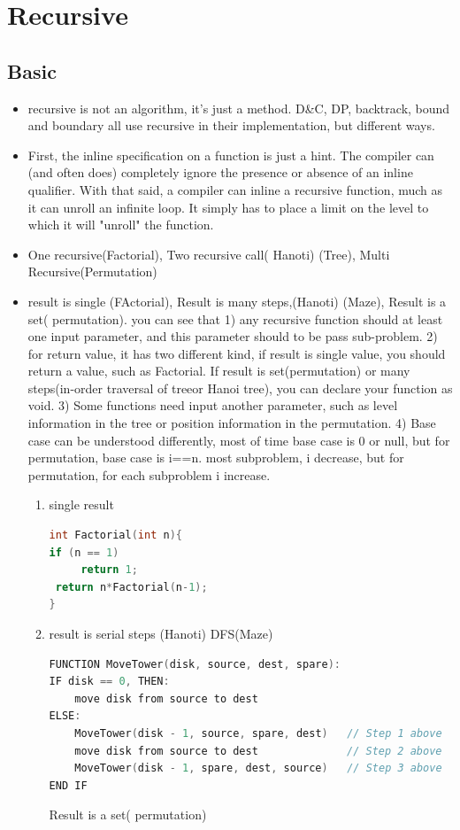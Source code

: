 \documentclass[a4paper,11pt,twoside]{book}
\begin{document}
\section{Recursive}
\subsection{Basic}
\begin{itemize}

	\item recursive is not an algorithm, it's just a method. D\&C, DP, backtrack, bound and boundary all use recursive in their implementation, but different ways. 
	
	\item First, the inline specification on a function is just a hint. The compiler can (and often does) completely ignore the presence or absence of an inline qualifier. With that said, a compiler can inline a recursive function, much as it can unroll an infinite loop. It simply has to place a limit on the level to which it will "unroll" the function.

	\item One recursive(Factorial),  Two recursive call( Hanoti) (Tree), Multi Recursive(Permutation)

	\item result is single (FActorial), Result is many steps,(Hanoti) (Maze), Result is a set( permutation). you can see that 1) any recursive function should at least one input parameter, and this parameter should to be pass sub-problem. 2) for return value, it has two different kind, if result is single value, you should return a value, such as Factorial. If result is set(permutation) or many steps(in-order traversal of treeor Hanoi tree), you can declare your function as void. 3) Some functions need input another parameter, such as level information in the tree or position information in the permutation. 4) Base case can be understood differently, most of time base case is 0 or null, but for permutation, base case is i==n.  most subproblem, i decrease, but for permutation, for each subproblem i increase. 
\begin{enumerate}
\item single result 
\begin{lstlisting}[frame=single, language=c++]
int Factorial(int n){
if (n == 1) 
     return 1;
 return n*Factorial(n-1);
}
\end{lstlisting}

	\item result is serial steps (Hanoti) DFS(Maze)
\begin{lstlisting}[frame=single, language=c++]
FUNCTION MoveTower(disk, source, dest, spare):
IF disk == 0, THEN:
    move disk from source to dest
ELSE:
    MoveTower(disk - 1, source, spare, dest)   // Step 1 above
    move disk from source to dest              // Step 2 above
    MoveTower(disk - 1, spare, dest, source)   // Step 3 above
END IF
\end{lstlisting}
Result is a set( permutation)


\end{enumerate}
\end{itemize}
\end{document}
